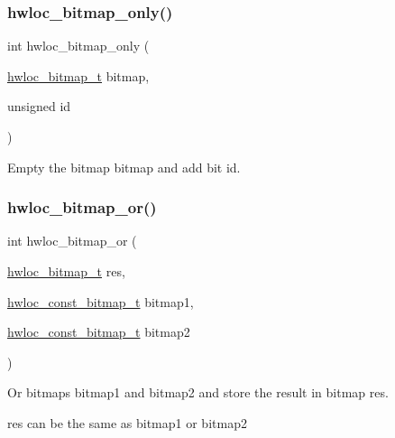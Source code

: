 \subsubsection{\texorpdfstring{hwloc\+\_\+bitmap\+\_\+only()}{hwloc\_bitmap\_only()}}
{\footnotesize\ttfamily int hwloc\+\_\+bitmap\+\_\+only (\begin{DoxyParamCaption}\item[{\hyperlink{a00205_gaa3c2bf4c776d603dcebbb61b0c923d84}{hwloc\+\_\+bitmap\+\_\+t}}]{bitmap,  }\item[{unsigned}]{id }\end{DoxyParamCaption})}



Empty the bitmap {\ttfamily bitmap} and add bit {\ttfamily id}. 

\mbox{\label{a00205_ga120b8aefb9ce7ef349929656359b1859}} 
\subsubsection{\texorpdfstring{hwloc\+\_\+bitmap\+\_\+or()}{hwloc\_bitmap\_or()}}
{\footnotesize\ttfamily int hwloc\+\_\+bitmap\+\_\+or (\begin{DoxyParamCaption}\item[{\hyperlink{a00205_gaa3c2bf4c776d603dcebbb61b0c923d84}{hwloc\+\_\+bitmap\+\_\+t}}]{res,  }\item[{\hyperlink{a00205_gae991a108af01d408be2776c5b2c467b2}{hwloc\+\_\+const\+\_\+bitmap\+\_\+t}}]{bitmap1,  }\item[{\hyperlink{a00205_gae991a108af01d408be2776c5b2c467b2}{hwloc\+\_\+const\+\_\+bitmap\+\_\+t}}]{bitmap2 }\end{DoxyParamCaption})}



Or bitmaps {\ttfamily bitmap1} and {\ttfamily bitmap2} and store the result in bitmap {\ttfamily res}. 

{\ttfamily res} can be the same as {\ttfamily bitmap1} or {\ttfamily bitmap2} \mbox{\label{a00205_ga062dbff93baeff3b425a7260c5463646}} 
